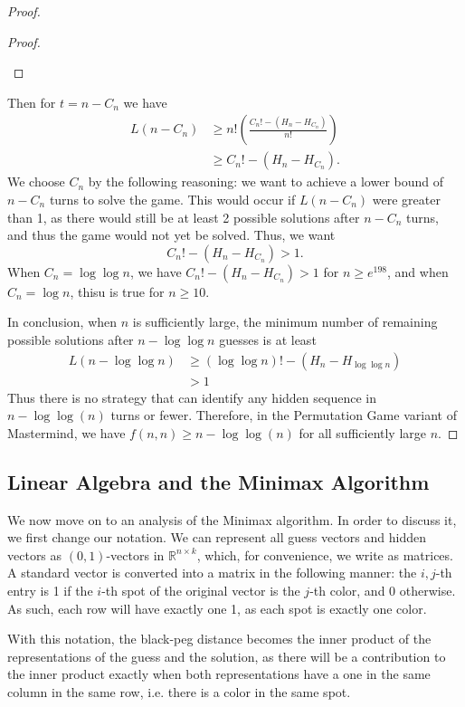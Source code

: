 \documentclass[12pt, a4paper]{article}
\newcommand{\R}{\mathbb{R}}           %
\begin{document}
\begin{proof}
\begin{enumerate}[label=]
\begin{proof}
\begin{enumerate}[label=]
		\end{enumerate}
		\end{proof}

	\end{enumerate}
	Then for $t = n-C_n$ we have
	\begin{align*}
	L(n-C_{n}) & \ge n!\left(\frac{C_{n}! - (H_n - H_{C_{n}})}{n!}\right)\\
	& \ge C_{n}! - (H_n-H_{C_{n}}).
	\end{align*}
	We choose $C_{n}$ by the following reasoning: we want to achieve a lower bound of $n-C_{n}$ turns to solve the game. This would occur if $L(n-C_n)$ were greater than 1, as there would still be at least 2 possible solutions after $n-C_n$ turns, and thus the game would not yet be solved. Thus, we want
		\begin{equation*}
			C_{n}! - (H_n - H_{C_{n}}) > 1.
		\end{equation*}
		When $C_{n}=\log\log n$, we have $C_{n}! - (H_n - H_{C_{n}}) > 1$ for $n\ge e^{198}$, and when $C_{n}=\log n$, thisu is true for $n\ge 10$.
		
 	In conclusion, when $n$ is sufficiently large, the minimum number of remaining
	possible solutions after $n - \log\log n$ guesses is at least
		\begin{align*}
		L(n-\log\log n)
		& \ge (\log\log n)! - (H_n - H_{\log\log n})\\
		& > 1
		\end{align*}
	Thus there is no strategy that can identify any hidden sequence in $n-\log\log(n)$ turns or fewer. Therefore, in the Permutation Game variant of Mastermind, we have $f(n, n)\ge n - \log\log(n)$ for all sufficiently large $n$.
	\end{proof}

\subsection{Linear Algebra and the Minimax Algorithm}
We now move on to an analysis of the Minimax algorithm. In order to discuss it, we first change our notation. We can represent all guess vectors and hidden vectors as $(0,1)$-vectors in $\R^{n\times k}$, which, for convenience, we write as matrices. A standard vector is converted into a matrix in the following manner: the $i,j$-th entry is 1 if the $i$-th spot of the original vector is the $j$-th color, and 0 otherwise. As such, each row will have exactly one 1, as each spot is exactly one color.

With this notation, the black-peg distance becomes the inner product of the representations of the guess and the solution, as there will be a contribution to the inner product exactly when both representations have a one in the same column in the same row, i.e. there is a color in the same spot. 
\end{document}
